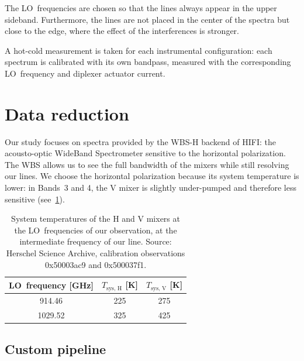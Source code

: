 The LO~frequencies are chosen so that the lines always appear in the upper sideband.
Furthermore, the lines are not placed in the center of the spectra but close to the edge, where the effect of the interferences is stronger.

A hot-cold measurement is taken for each instrumental configuration: each spectrum is calibrated with its own bandpass, measured with the corresponding LO~frequency and diplexer actuator current.





\FloatBarrier
\section{Data reduction}
\label{sec:s140_data_reduction}
Our study focuses on spectra provided by the WBS-H backend of HIFI: the acousto-optic WideBand Spectrometer sensitive to the horizontal polarization.
The WBS allows us to see the full bandwidth of the mixers while still resolving our lines.
We choose the horizontal polarization because its system temperature is lower: in Bands~3 and 4, the V mixer is slightly under-pumped and therefore less sensitive (see~\cref{tab:chapter5_tsys}).

\begin{table}
    \centering
    \begin{tabular}{ccc}
        \toprule
        LO~frequency [\si{\giga\hertz}] &
        $T_\text{sys, H}$ [\si{\kelvin}] &
        $T_\text{sys, V}$ [\si{\kelvin}]\\
        \midrule
        \num{914.46}   &   225   &   275 \\ %
        \num{1029.52}  &   325   &   425 \\ %
        \bottomrule
    \end{tabular}
    \caption{
        System temperatures of the H and V mixers at the LO~frequencies of our observation, at the intermediate frequency of our line.
        Source: Herschel Science Archive, calibration observations 0x50003ac9
        and 0x500037f1.
    }
    \label{tab:chapter5_tsys}
\end{table}



\subsection{Custom pipeline}

